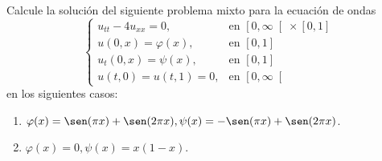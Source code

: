 \begin{ejemplo} %
    Calcule la solución del siguiente problema mixto para la ecuación de ondas
    \begin{equation*}
        \left\{\begin{array}{ll}
                u_{tt} - 4u_{xx} = 0 , & \text{en\ } \left[0,\infty\right[\times [0,1] \\
                    u(0,x) = \varphi(x), &\text{en\ } [0,1] \\
                    u_t(0,x) = \psi(x), &\text{en\ } [0,1] \\
                    u(t,0) = u(t,1) = 0, &\text{en\ } \left[0,\infty\right[
        \end{array}\right.
    \end{equation*}
    en los siguientes casos:
    \begin{enumerate}[label=\alph*)]
        \item $\varphi(x) = \sen(\pi x) + \sen(2\pi x), \psi(x) = -\sen(\pi x) + \sen(2\pi x)$.
        \item $\varphi(x) = 0, \psi(x) = x(1-x)$.
    \end{enumerate}~\\


\end{ejemplo}
